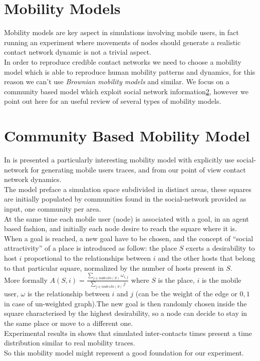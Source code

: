 \section{Mobility Models}
\label{mobility_models}

Mobility models are key aspect in simulations involving mobile users, in fact running an experiment where movements of nodes should generate a realistic contact network dynamic is not a trivial aspect. \\
In order to reproduce credible contact networks we need to choose a mobility model which is able to reproduce  human mobility patterns and dynamics, for this reason we can't use \emph{Brownian mobility models} and similar. We focus on a community based model which exploit social network information\ref{mobility_community_based_model}, however we point out here\cite{Camp02asurvey} for an useful review of several types of mobility models.

\section{Community Based Mobility Model}
\label{mobility_community_based_model}

In\cite{Musolesi:2006:CBM:1132983.1132990} is presented a particularly interesting mobility model with explicitly use social-network for generating mobile users traces, and from our point of view contact network dynamics. \\
The model preface a simulation space subdivided in distinct areas, these squares are initially populated by communities found in the social-network provided as input, one community per area.\\
At the same time each mobile user (node) is associated with a goal, in an agent based fashion, and initially each node desire to reach the square where it is.\\
When a goal is reached, a new goal have to be chosen, and the concept of ``social attractivity'' of a place is introduced as follow: the place $S$ exerts a desirability to host $i$ proportional to the relationships between $i$ and the other hosts that belong to that particular square, normalized by the number of hosts present in $S$. \\
More formally $ A(S,i) = \frac{ \sum_{j \in nodesIn(S)}{ \omega_{i,j}}  }{ \sum_{j \in nodesIn(S)}{j}  } $ where $S$ is the place, $i$ is the mobile user, $\omega$ is the relationship between $i$ and $j$ (can be the weight of the edge or ${0,1}$ in case of un-weighted graph).The new goal is then randomly chosen inside the square characterised by the highest desirability, so a node can decide to stay in the same place or move to a different one.\\
Experimental results in \cite{Musolesi:2006:CBM:1132983.1132990} shows that simulated inter-contacts times present a time distribution similar to real mobility traces.\\
So this mobility model might represent a good foundation for our experiment.

